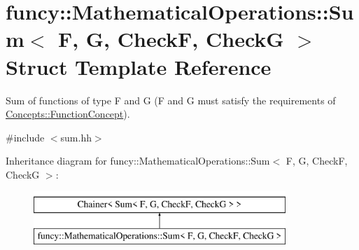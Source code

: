 \hypertarget{structfuncy_1_1MathematicalOperations_1_1Sum}{\section{funcy\-:\-:Mathematical\-Operations\-:\-:Sum$<$ F, G, Check\-F, Check\-G $>$ Struct Template Reference}
\label{structfuncy_1_1MathematicalOperations_1_1Sum}
}


Sum of functions of type F and G (F and G must satisfy the requirements of \hyperlink{structfuncy_1_1Concepts_1_1FunctionConcept}{Concepts\-::\-Function\-Concept}).  




{\ttfamily \#include $<$sum.\-hh$>$}

Inheritance diagram for funcy\-:\-:Mathematical\-Operations\-:\-:Sum$<$ F, G, Check\-F, Check\-G $>$\-:\begin{figure}[H]
\begin{center}
\leavevmode
\includegraphics[height=2.000000cm]{structfuncy_1_1MathematicalOperations_1_1Sum}
\end{center}
\end{figure}
